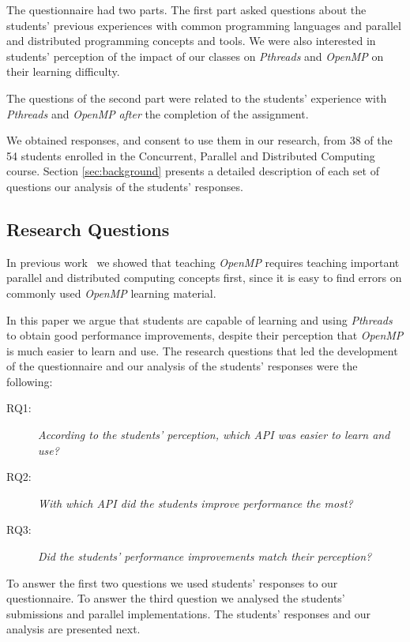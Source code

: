 The questionnaire had two parts. The first part asked questions
about the students' previous experiences with common programming languages and
parallel and distributed programming concepts and tools. We were also
interested in students' perception of the impact of our classes on
\textit{Pthreads} and \textit{OpenMP} on their learning difficulty.

The questions of the second part were related to the students'
experience with \textit{Pthreads} and \textit{OpenMP} \textit{after}
the completion of the assignment.

We obtained responses, and consent to use them in our research, from 38 of the
54 students enrolled in the Concurrent, Parallel and Distributed Computing
course. Section \ref{sec:background} presents a detailed description of
each set of questions our analysis of the students' responses.

\subsection{Research Questions}
\label{sec:resques}

In previous work~\cite{goncalves:OpenMPNotEasy} we showed that
teaching \textit{OpenMP} requires teaching important parallel
and distributed computing concepts first, since it is easy
to find errors on commonly used \textit{OpenMP} learning material.

In this paper we argue that students are capable of learning and using
\textit{Pthreads} to obtain good performance improvements, despite their
perception that \textit{OpenMP} is much easier to learn and use.
The research questions that led the development of the questionnaire
and our analysis of the students' responses were the following:

\begin{description}
    \item[RQ1:] \textit{According to the students' perception, which API was
        easier to learn and use?}
    \item[RQ2:] \textit{With which API did the students improve performance the
        most?}
    \item[RQ3:] \textit{Did the students' performance improvements match their
        perception?}
\end{description}

To answer the first two questions we used students' responses to
our questionnaire. To answer the third question we analysed the
students' submissions and parallel implementations. The
students' responses and our analysis are presented next.
